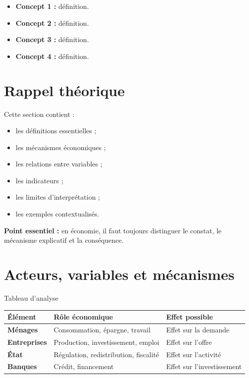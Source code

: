\documentclass[11pt,a4paper]{article}
\begin{document}
\begin{cadretheorie}
\begin{itemize}
    \item \textbf{Concept 1 :} définition.
    \item \textbf{Concept 2 :} définition.
    \item \textbf{Concept 3 :} définition.
    \item \textbf{Concept 4 :} définition.
\end{itemize}
\end{cadretheorie}

\section{Rappel théorique}

\begin{cadretheorie}
Cette section contient :
\begin{itemize}
    \item les définitions essentielles ;
    \item les mécanismes économiques ;
    \item les relations entre variables ;
    \item les indicateurs ;
    \item les limites d’interprétation ;
    \item les exemples contextualisés.
\end{itemize}

\medskip

\textbf{Point essentiel :} en économie, il faut toujours distinguer le constat, le mécanisme explicatif et la conséquence.
\end{cadretheorie}

\section{Acteurs, variables et mécanismes}

\begin{cadregris}{Tableau d’analyse}
\renewcommand{\arraystretch}{1.35}
\begin{tabularx}{\textwidth}{>{\bfseries}p{3.2cm}X X}
\toprule
Élément & Rôle économique & Effet possible \\
\midrule
Ménages & Consommation, épargne, travail & Effet sur la demande \\
Entreprises & Production, investissement, emploi & Effet sur l’offre \\
État & Régulation, redistribution, fiscalité & Effet sur l’activité \\
Banques & Crédit, financement & Effet sur l’investissement \\
\bottomrule
\end{tabularx}
\end{cadregris}
\end{document}
